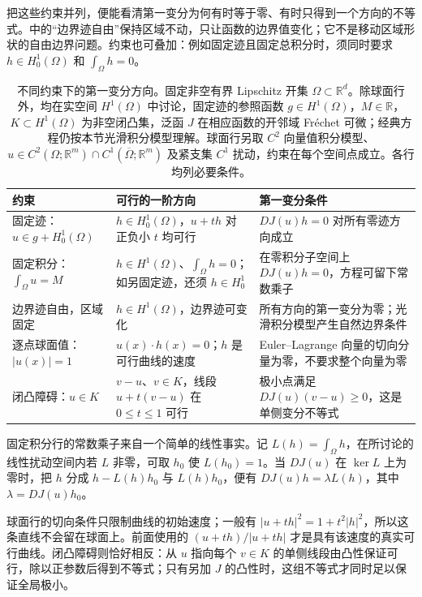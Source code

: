把这些约束并列，便能看清第一变分为何有时等于零、有时只得到一个方向的不等式。中的“边界迹自由”保持区域不动，只让函数的边界值变化；它不是移动区域形状的自由边界问题。约束也可叠加：例如固定迹且固定总积分时，须同时要求 \(h\in H_0^1(\Omega)\) 和 \(\int_\Omega h=0\)。

\begin{table}[htbp]
\centering
\small
\setlength{\tabcolsep}{5pt}
\caption[不同约束下的第一变分方向]{不同约束下的第一变分方向。固定非空有界 Lipschitz 开集 \(\Omega\subset\mathbb R^d\)。除球面行外，均在实空间 \(H^1(\Omega)\) 中讨论，固定迹的参照函数 \(g\in H^1(\Omega)\)，\(M\in\mathbb R\)，\(K\subset H^1(\Omega)\) 为非空闭凸集，泛函 \(J\) 在相应函数的开邻域 Fréchet 可微；经典方程仍按本节光滑积分模型理解。球面行另取 \(C^2\) 向量值积分模型、\(u\in C^2(\Omega;\mathbb R^m)\cap C^1(\overline\Omega;\mathbb R^m)\) 及紧支集 \(C^1\) 扰动，约束在每个空间点成立。各行均列必要条件。}
\label{b2:tab:14-admissible-variations}
\begin{tabularx}{\linewidth}{@{}>{\raggedright\arraybackslash}p{3.1cm}>{\raggedright\arraybackslash}X>{\raggedright\arraybackslash}p{5.7cm}@{}}
\toprule
约束 & 可行的一阶方向 & 第一变分条件 \\
\midrule
固定迹：\(u\in g+H_0^1(\Omega)\) & \(h\in H_0^1(\Omega)\)，\(u+th\) 对正负小 \(t\) 均可行 & \(DJ(u)h=0\) 对所有零迹方向成立 \\
固定积分：\(\int_\Omega u=M\) & \(h\in H^1(\Omega)\)、\(\int_\Omega h=0\)；如另固定迹，还须 \(h\in H_0^1\) & 在零积分子空间上 \(DJ(u)h=0\)，方程可留下常数乘子 \\
边界迹自由，区域固定 & \(h\in H^1(\Omega)\)，边界迹可变化 & 所有方向的第一变分为零；光滑积分模型产生自然边界条件 \\
逐点球面值：\(|u(x)|=1\) & \(u(x)\cdot h(x)=0\)；\(h\) 是可行曲线的速度 & Euler--Lagrange 向量的切向分量为零，不要求整个向量为零 \\
闭凸障碍：\(u\in K\) & \(v-u\)、\(v\in K\)，线段 \(u+t(v-u)\) 在 \(0\leq t\leq1\) 可行 & 极小点满足 \(DJ(u)(v-u)\geq0\)，这是单侧变分不等式 \\
\bottomrule
\end{tabularx}
\end{table}

固定积分行的常数乘子来自一个简单的线性事实。记 \(L(h)=\int_\Omega h\)，在所讨论的线性扰动空间内若 \(L\) 非零，可取 \(h_0\) 使 \(L(h_0)=1\)。当 \(DJ(u)\) 在 \(\ker L\) 上为零时，把 \(h\) 分成 \(h-L(h)h_0\) 与 \(L(h)h_0\)，便有 \(DJ(u)h=\lambda L(h)\)，其中 \(\lambda=DJ(u)h_0\)。

球面行的切向条件只限制曲线的初始速度；一般有 \(|u+th|^2=1+t^2|h|^2\)，所以这条直线不会留在球面上。前面使用的 \((u+th)/|u+th|\) 才是具有该速度的真实可行曲线。闭凸障碍则恰好相反：从 \(u\) 指向每个 \(v\in K\) 的单侧线段由凸性保证可行，除以正参数后得到不等式；只有另加 \(J\) 的凸性时，这组不等式才同时足以保证全局极小。
